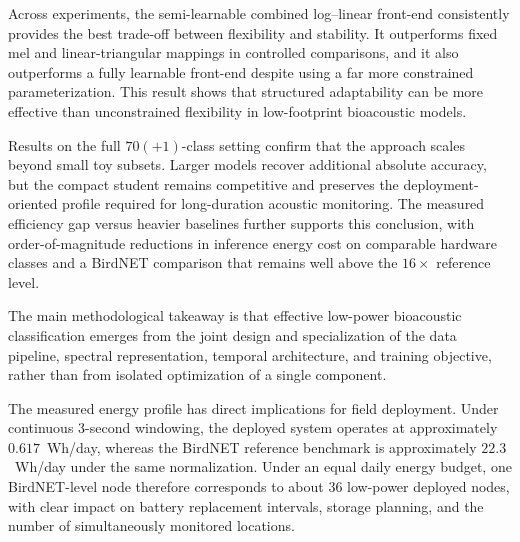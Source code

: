 \documentclass[a4paper,singleside,12pt]{report} %
\begin{document}
		\begin{sloppypar}
		Across experiments, the semi-learnable combined log--linear front-end consistently provides the best trade-off between flexibility and stability. It outperforms fixed mel and linear-triangular mappings in controlled comparisons, and it also outperforms a fully learnable front-end despite using a far more constrained parameterization. This result shows that structured adaptability can be more effective than unconstrained flexibility in low-footprint bioacoustic models.
		\end{sloppypar}

		\begin{sloppypar}
		Results on the full \(70(+1)\)-class setting confirm that the approach scales beyond small toy subsets. Larger models recover additional absolute accuracy, but the compact student remains competitive and preserves the deployment-oriented profile required for long-duration acoustic monitoring. The measured efficiency gap versus heavier baselines further supports this conclusion, with order-of-magnitude reductions in inference energy cost on comparable hardware classes and a BirdNET comparison that remains well above the \(16\times\) reference level.
		\end{sloppypar}

		The main methodological takeaway is that effective low-power bioacoustic classification emerges from the joint design and specialization of the data pipeline, spectral representation, temporal architecture, and training objective, rather than from isolated optimization of a single component.

		The measured energy profile has direct implications for field deployment. Under continuous 3-second windowing, the deployed system operates at approximately \(0.617\)~Wh/day, whereas the BirdNET reference benchmark is approximately \(22.3\)~Wh/day under the same normalization. Under an equal daily energy budget, one BirdNET-level node therefore corresponds to about 36 low-power deployed nodes, with clear impact on battery replacement intervals, storage planning, and the number of simultaneously monitored locations.
\end{document}
